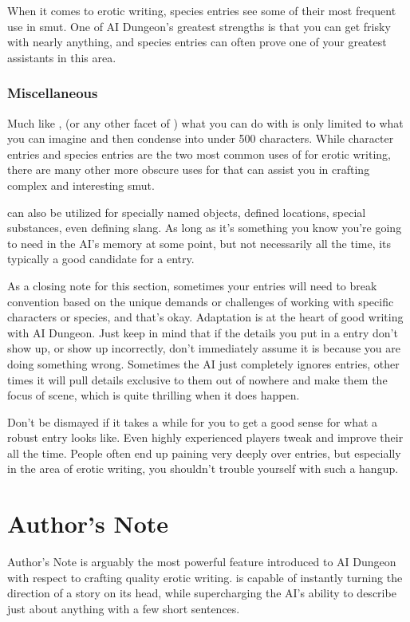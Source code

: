 ﻿\documentclass[Coomer-main.tex]{subfiles}
\begin{document}
When it comes to erotic writing, species entries see some of their most frequent use in smut. One of AI Dungeon's greatest strengths is that you can get frisky with nearly anything, and species entries can often prove one of your greatest assistants in this area.

\subsection{Miscellaneous}

Much like \an, (or any other facet of \aid) what you can do with \wi is only limited to what you can imagine and then condense into under 500 characters. While character entries and species entries are the two most common uses of \wi for erotic writing, there are many other more obscure uses for \wi that can assist you in crafting complex and interesting smut.

\wi can also be utilized for specially named objects, defined locations, special substances, even defining slang. As long as it's something you know you're going to need in the AI's memory at some point, but not necessarily all the time, its typically a good candidate for a \wi entry.

As a closing note for this section, sometimes your \wi entries will need to break convention based on the unique demands or challenges of working with specific characters or species, and that's okay. Adaptation is at the heart of good writing with AI Dungeon. Just keep in mind that if the details you put in a \wi entry don't show up, or show up incorrectly, don't immediately assume it is because you are doing something wrong. Sometimes the AI just completely ignores entries, other times it will pull details exclusive to them out of nowhere and make them the focus of scene, which is quite thrilling when it does happen.

Don't be dismayed if it takes a while for you to get a good sense for what a robust \wi entry looks like. Even highly experienced players tweak and improve their \wi all the time. People often end up paining very deeply over \wi entries, but especially in the area of erotic writing, you shouldn't trouble yourself with such a hangup.

\chapter{Author's Note}

Author's Note is arguably the most powerful feature introduced to AI Dungeon with respect to crafting quality erotic writing. \an is capable of instantly turning the direction of a story on its head, while supercharging the AI's ability to describe just about anything with a few short sentences.
\end{document}
